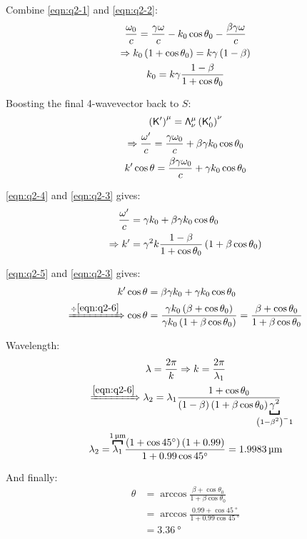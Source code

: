 \begin{parts}
	Combine \eqref{eqn:q2-1} and \eqref{eqn:q2-2}:
	\begin{gather}
		\frac{\omega_0}{c} = \frac{\gamma\omega}{c} - k_0 \cos\theta_0 - \frac{\beta\gamma\omega}{c} \notag\\
		\Rightarrow k_0 \left(1+\cos\theta_0\right) = k\gamma\left(1-\beta\right) \notag\\
		k_0 = k\gamma\frac{1-\beta}{1+\cos\theta_0} \label{eqn:q2-3}
	\end{gather}
	
	Boosting the final 4-wavevector back to $S$:
	\begin{gather}
		\left(\mathsf{K}^\prime\right)^\mu = \mathsf{\Lambda}^\mu_\nu \left(\mathsf{K}^\prime_0\right)^\nu \notag\\
		\Rightarrow \frac{\omega^\prime}{c} = \frac{\gamma\omega_0}{c} + \beta\gamma k_0 \cos\theta_0 \label{eqn:q2-4} \\
		k^\prime \cos\theta = \frac{\beta\gamma\omega_0}{c} + \gamma k_0 \cos\theta_0 \label{eqn:q2-5}
	\end{gather}
	
	\eqref{eqn:q2-4} and \eqref{eqn:q2-3} gives:
	\begin{align}
		\frac{\omega^\prime}{c} &= \gamma k_0 + \beta\gamma k_0 \cos\theta_0 \notag\\
		\Rightarrow k^\prime &= \gamma^2 k \frac{1-\beta}{1+\cos\theta_0} \left(1+\beta\cos\theta_0\right) \label{eqn:q2-6}
	\end{align}
	
	\eqref{eqn:q2-5} and \eqref{eqn:q2-3} gives:
	\begin{align}
		k^\prime \cos\theta &= \beta\gamma k_0 + \gamma k_0 \cos\theta_0 \notag\\
		\xRightarrow{\div\eqref{eqn:q2-6}} \cos\theta &= \frac{\gamma k_0 \left(\beta + \cos\theta_0\right)}{\gamma k_0 \left(1 + \beta\cos\theta_0\right)} = \frac{\beta + \cos\theta_0}{1 + \beta\cos\theta_0} \label{eqn:q2-7}
	\end{align}
	
	Wavelength:
	\begin{gather*}
		\lambda = \frac{2\pi}{k} \Rightarrow k = \frac{2\pi}{\lambda_1} \\
		\xRightarrow{\eqref{eqn:q2-6}} \lambda_2 = \lambda_1 \frac{1+\cos\theta_0}{\rbracket{1-\beta} \rbracket{1+\beta\cos\theta_0}\underbracket{\gamma^2}_{\mathclap{\rbracket{1-\beta^2}^-1}}} \\
		\lambda_2 = \overbracket{\lambda_1}^{\mathclap{\SI{1}{\micro\metre}}} \frac{\rbracket{1+\cos\SI{45}{\degree}} \rbracket{1+\num{0.99}}}{1+\num{0.99}\cos\SI{45}{\degree}}
		= \SI{1.9983}{\micro\metre}
	\end{gather*}
	
	And finally:
	\begin{align*}
		\theta &= \arccos\frac{\beta+\cos\theta_0}{1+\beta\cos\theta_0} \\
		&= \arccos\frac{\num{0.99} + \cos\SI{45}{\degree}}{1 + \num{0.99} \cos\SI{45}{\degree}} \\
		&= \SI{3.36}{\degree}
	\end{align*}
\end{parts}

